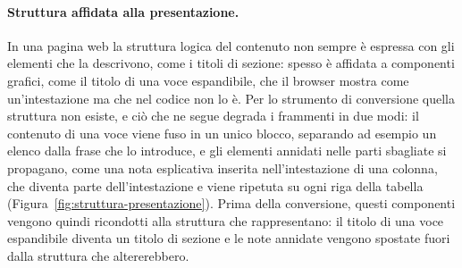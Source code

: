 \paragraph{Struttura affidata alla presentazione.} In una pagina web la struttura logica del contenuto non sempre è
espressa con gli elementi che la descrivono, come i titoli di sezione: spesso è affidata a componenti grafici, come
il titolo di una voce espandibile, che il browser mostra come un'intestazione ma che nel codice non lo è. Per lo
strumento di conversione quella struttura non esiste, e ciò che ne segue degrada i frammenti in due modi: il
contenuto di una voce viene fuso in un unico blocco, separando ad esempio un elenco dalla frase che lo introduce, e
gli elementi annidati nelle parti sbagliate si propagano, come una nota esplicativa inserita nell'intestazione di
una colonna, che diventa parte dell'intestazione e viene ripetuta su ogni riga della tabella
(Figura~\ref{fig:struttura-presentazione}). Prima della conversione,
questi componenti vengono quindi ricondotti alla struttura che rappresentano: il titolo di una voce espandibile
diventa un titolo di sezione e le note annidate vengono spostate fuori dalla struttura che altererebbero.


